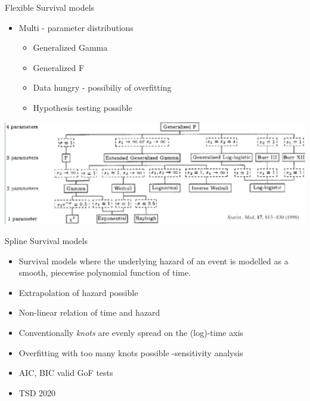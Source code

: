 \documentclass[
  ignorenonframetext,
]{beamer}
\providecommand{\tightlist}{%
  \setlength{\itemsep}{0pt}\setlength{\parskip}{0pt}}
\begin{document}
\begin{frame}{Flexible Survival models}
\protect\hypertarget{flexible-survival-models}{}

\begin{itemize}
\tightlist
\item
  Multi - parameter distributions

  \begin{itemize}
  \tightlist
  \item
    Generalized Gamma
  \item
    Generalized F
  \item
    Data hungry - possibiliy of overfitting\\
  \item
    Hypothesis testing possible
  \end{itemize}
\end{itemize}

\includegraphics[width=1\linewidth]{figures/genf}

\end{frame}

\begin{frame}{Spline Survival models}
\protect\hypertarget{spline-survival-models}{}

\begin{itemize}
\tightlist
\item
  Survival models where the underlying hazard of an event is modelled as
  a smooth, piecewise polynomial function of time.
\item
  Extrapolation of hazard possible
\item
  Non-linear relation of time and hazard
\item
  Conventionally \emph{knots} are evenly spread on the (log)-time axis
\item
  Overfitting with too many knots possible -sensitivity analysis
\item
  AIC, BIC valid GoF tests
\item
  TSD 2020
\end{itemize}

\end{frame}
\end{document}
